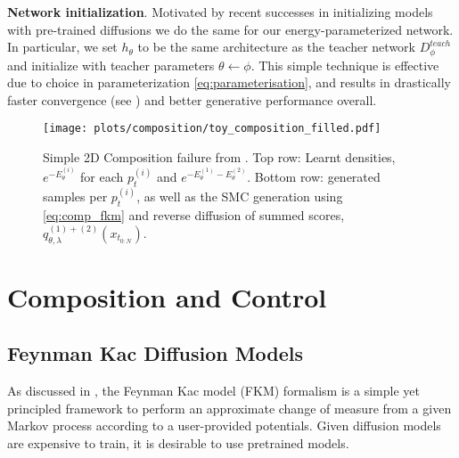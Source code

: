 \textbf{Network initialization}. Motivated by recent successes in initializing models with pre-trained diffusions \citep{lee2024improving, kim2024simple} we do the same for our energy-parameterized network. In particular, we set  $h_\theta$ to be the same architecture as the teacher network $D^{teach}_{\phi}$ and initialize with teacher parameters $\theta \gets \phi$. This simple technique is effective due to choice in parameterization \eqref{eq:parameterisation}, and results in drastically faster convergence (see ) and better generative performance overall.

\begin{figure*}[!t]
   \centering \texttt{[image: plots/composition/toy\_composition\_filled.pdf]} 
 \caption{Simple 2D Composition failure from \cite{du2023reduce}. Top row: Learnt densities, $e^{-E^{(i)}_\theta}$ for each $p^{(i)}_{t}$ and $e^{-E^{(1)}_\theta-E^{(2)}_\theta}$. Bottom row: generated samples per $p^{(i)}_{t}$, as well as the SMC generation using \eqref{eq:comp_fkm} and reverse diffusion of summed scores,  ${q}_{\theta, \lambda}^{(1)+(2)}(x_{t_{0:N}})$.}
 \label{fig:toy_composition}
\end{figure*}
\newpage
\section{Composition and Control} \label{sec:comp_cont}
\subsection{Feynman Kac Diffusion Models}
As discussed in , the Feynman Kac model (FKM) formalism \citep{chopin2020introduction, del2004feynman} is a simple yet principled framework to perform an approximate change of measure from a given Markov process according to a user-provided potentials. Given diffusion models are expensive to train, it is desirable to use pretrained models. 


